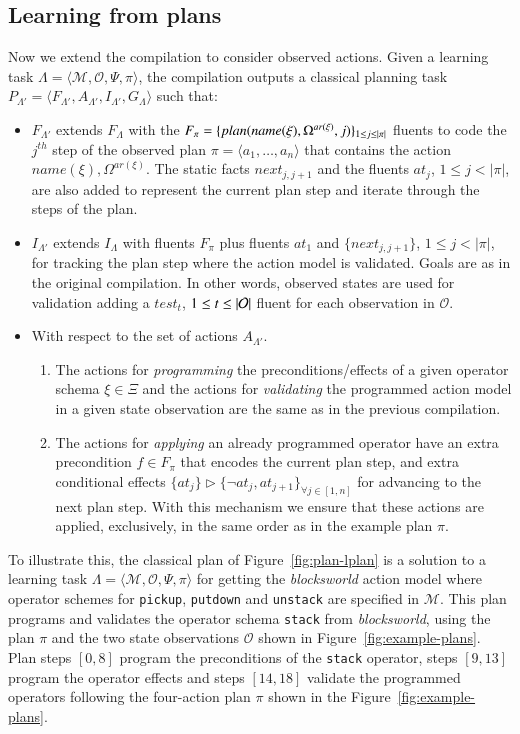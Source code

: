 \documentclass[3p,times]{elsarticle}
\newcommand{\tup}[1]{{\langle #1 \rangle}}
\begin{document}
\subsection{Learning from plans}
Now we extend the compilation to consider observed actions. Given a learning task $\Lambda=\tup{\mathcal{M},\mathcal{O},\Psi,\pi}$, the compilation outputs a classical planning task $P_{\Lambda'}=\tup{F_{\Lambda'},A_{\Lambda'},I_{\Lambda'},G_{\Lambda}}$ such that:
\begin{itemize}
\item $F_{\Lambda'}$ extends $F_{\Lambda}$ with the $F_{\pi}=\{plan(name(\xi),\Omega^{ar(\xi)},j)\}_{\small 1\leq j\leq |\pi|}$ fluents to code the $j^{th}$ step of the observed plan $\pi=\tup{a_1, \ldots, a_n}$ that contains the action $name(\xi),\Omega^{ar(\xi)}$. The static facts $next_{j,j+1}$ and the fluents $at_j$, {\small $1\leq j< |\pi|$}, are also added to represent the current plan step and iterate through the steps of the plan.
\item $I_{\Lambda'}$ extends $I_{\Lambda}$ with fluents $F_{\pi}$ plus fluents $at_1$ and $\{next_{j,j+1}\}$, {\small $1\leq j<|\pi|$}, for tracking the plan step where the action model is validated. Goals are as in the original compilation. In other words, observed states are used for validation adding a $test_t$, ${\small 1\leq t\leq |\mathcal{O}|}$ fluent for each observation in $\mathcal{O}$.
\item With respect to the set of actions $A_{\Lambda'}$.
\begin{enumerate}
\item The actions for {\em programming} the preconditions/effects of a given operator schema $\xi\in\Xi$ and the actions for {\em validating} the programmed action model in a given state observation are the same as in the previous compilation.
\item The actions for {\em applying} an already programmed operator have an extra precondition $f\in F_{\pi}$ that encodes the current plan step, and extra conditional effects $\{at_{j}\}\rhd\{\neg at_{j},at_{j+1}\}_{\forall j\in [1,n]}$ for advancing to the next plan step. With this mechanism we ensure that these actions are applied, exclusively, in the same order as in the example plan $\pi$.
\end{enumerate}
\end{itemize}

To illustrate this, the classical plan of Figure~\ref{fig:plan-lplan} is a solution to a learning task $\Lambda=\tup{\mathcal{M},\mathcal{O},\Psi,\pi}$ for getting the {\em blocksworld} action model where operator schemes for {\tt\small pickup}, {\tt\small putdown} and {\tt\small unstack} are specified in $\mathcal{M}$. This plan programs and validates the operator schema {\tt\small stack} from {\em blocksworld}, using the plan $\pi$ and the two state observations $\mathcal{O}$ shown in Figure~\ref{fig:example-plans}. Plan steps $[0,8]$ program the preconditions of the {\tt\small stack} operator, steps $[9,13]$ program the operator effects and steps $[14,18]$ validate the programmed operators following the four-action plan $\pi$ shown in the Figure~\ref{fig:example-plans}.
\end{document}
